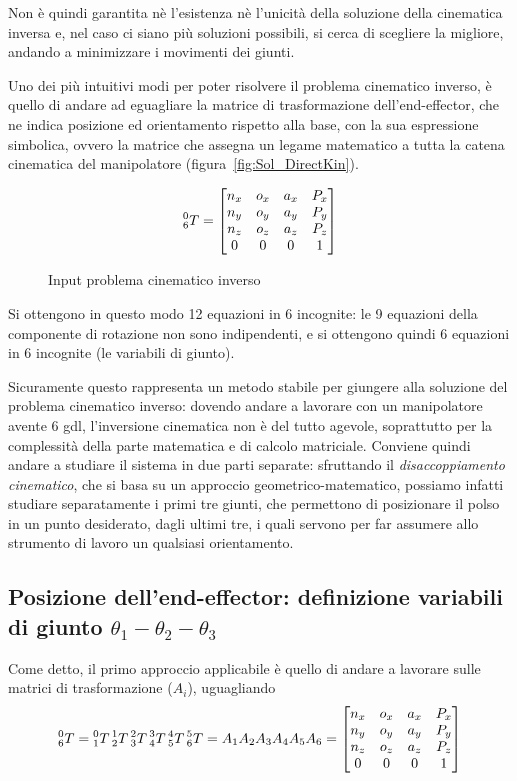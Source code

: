 Non è quindi garantita nè l'esistenza nè l'unicità della soluzione della cinematica inversa e, nel caso ci siano più soluzioni possibili, si cerca di scegliere la migliore, andando a minimizzare i movimenti dei giunti.

Uno dei più intuitivi modi per poter risolvere il problema cinematico inverso, è quello di andare ad eguagliare la matrice di trasformazione dell'end-effector, che ne indica posizione ed orientamento rispetto alla base, con la sua espressione simbolica, ovvero la matrice che assegna un legame matematico a tutta la catena cinematica del manipolatore (figura~\vref{fig:Sol_DirectKin}).
\begin{figure}[h]
	\begin{equation*}
	\label{mat:InputInverseKin}
	\prescript{0}{6}{T}	= 
	\begin{bmatrix}
	n_x & o_x & a_x & P_x\\
	n_y & o_y & a_y & P_y\\
	n_z & o_z & a_z & P_z\\
	0   & 0   & 0   & 1
	\end{bmatrix}
	\end{equation*}	
	\caption{Input problema cinematico inverso}
\end{figure} 

Si ottengono in questo modo 12 equazioni in 6 incognite: le 9 equazioni della componente di rotazione non sono indipendenti, e si ottengono quindi 6 equazioni in 6 incognite (le variabili di giunto). 

Sicuramente questo rappresenta un metodo stabile per giungere alla soluzione del problema cinematico inverso: dovendo andare a lavorare con un manipolatore avente 6 gdl, l'inversione cinematica non è del tutto agevole, soprattutto per la complessità della parte matematica e di calcolo matriciale.
Conviene quindi andare a studiare il sistema in due parti separate: sfruttando il \emph{disaccoppiamento cinematico}, che si basa su un approccio geometrico-matematico, possiamo infatti studiare separatamente i primi tre giunti, che permettono di posizionare il polso in un punto desiderato, dagli ultimi tre, i quali servono per far assumere allo strumento di lavoro un qualsiasi orientamento.
\subsection{Posizione dell'end-effector: definizione variabili di giunto $\theta_1 - \theta_2 - \theta_3$}
Come detto, il primo approccio applicabile è quello di andare a lavorare sulle matrici di trasformazione ($A_i$), uguagliando
\begin{equation*}
		\prescript{0}{6}{T}	= \prescript{0}{1}{T} \prescript{1}{2}{T} \prescript{2}{3}{T} \prescript{3}{4}{T} \prescript{4}{5}{T} \prescript{5}{6}{T}  = A_1A_2A_3A_4A_5A_6 = 		
		\begin{bmatrix}
			n_x & o_x & a_x & P_x\\
			n_y & o_y & a_y & P_y\\
			n_z & o_z & a_z & P_z\\
			0   & 0   & 0   & 1
		\end{bmatrix} 
\end{equation*}

